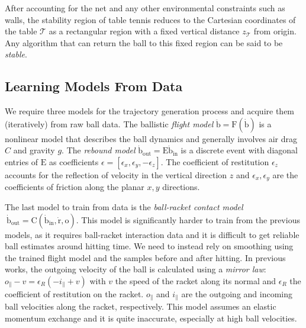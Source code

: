 \documentclass[letterpaper, 10 pt, conference]{ieeeconf}
\newcommand{\boldvec}[1]{\boldsymbol{\mathrm{#1}}}
\let\vec\boldvec
\newcommand{\ballFull}{\vec{x}_{B}} %
\newcommand{\ball}{\vec{b}} %
\newcommand{\ballDynamics}{\vec{F}} %
\newcommand{\drag}{C} %
\newcommand{\gravity}{g}
\newcommand{\bounce}{\vec{E}}
\newcommand{\contact}{\vec{C}} %
\newcommand{\racket}{\vec{r}} %
\newcommand{\orient}{\vec{o}} %
\newcommand{\court}{\mathcal{T}} %
\begin{document}
After accounting for the net and any other environmental constraints such as walls, the stability region of table tennis reduces to the Cartesian coordinates of the table $\court$ as a rectangular region with a fixed vertical distance $z_{\court}$ from origin. Any algorithm that can return the ball to this fixed region can be said to be \emph{stable}.


\subsection{Learning Models From Data}

We require three models for the trajectory generation process and acquire them (iteratively) from raw ball data. The ballistic \emph{flight model} $\ddot{\ball} = \ballDynamics(\dot{\ball})$ is a nonlinear model that describes the ball dynamics and generally involves air drag $\drag$ and gravity $\gravity$. The \emph{rebound model} $\dot{\ball}_{\mathrm{out}} = \bounce\dot{\ball}_{\mathrm{in}}$ is a discrete event with diagonal entries of $\bounce$ as coefficients $\epsilon = [\epsilon_{x}, \epsilon_{y}, -\epsilon_{z}]$. The coefficient of restitution $\epsilon_{z}$ accounts for the reflection of velocity in the vertical direction $z$ and $\epsilon_{x}, \epsilon_{y}$ are the coefficients of friction along the planar $x,y$ directions.


The last model to train from data is the \emph{ball-racket contact model} $\ \dot{\ball}_{\mathrm{out}} = \contact(\dot{\ball}_{\mathrm{in}},\dot{\racket},\orient)$. This model is significantly harder to train from the previous models, as it requires ball-racket interaction data and it is difficult to get reliable ball estimates around hitting time. We need to instead rely on smoothing using the trained flight model and the samples before and after hitting. In previous works, the outgoing velocity of the ball is calculated using a \emph{mirror law}: $o_{\parallel} - v = \epsilon_{R} (-i_{\parallel} + v)$ with $v$ the speed of the racket along its normal and $\epsilon_{R}$ the coefficient of restitution on the racket. $o_{\parallel}$ and $i_{\parallel}$ are the outgoing and incoming ball velocities along the racket, respectively. This model assumes an elastic momentum exchange and it is quite inaccurate, especially at high ball velocities.
\end{document}
